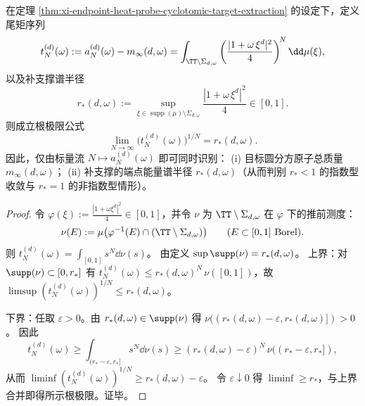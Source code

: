 \begin{theorem}[由单标量探针序列识别补支撑谱半径]\label{thm:xi-endpoint-heat-probe-complement-radius-from-scalar-flow}
在定理 \ref{thm:xi-endpoint-heat-probe-cyclotomic-target-extraction} 的设定下，定义尾矩序列
\[
t_N^{(d)}(\omega):=a_N^{(d)}(\omega)-m_\infty(d,\omega)
=\int_{\TT\setminus\Sigma_{d,\omega}}\left(\frac{|1+\omega\,\xi^{d}|^{2}}{4}\right)^{\!N}\dd\mu(\xi),
\]
以及补支撑谱半径
\[
r_{\ast}(d,\omega)
:=\sup_{\xi\in\operatorname{supp}(\mu)\setminus\Sigma_{d,\omega}}\frac{|1+\omega\,\xi^{d}|^{2}}{4}\in[0,1].
\]
则成立根极限公式
\[
\boxed{\;
\lim_{N\to\infty}\bigl(t_N^{(d)}(\omega)\bigr)^{1/N}=r_{\ast}(d,\omega).\;}
\]
因此，仅由标量流 \(N\mapsto a_N^{(d)}(\omega)\) 即可同时识别：
(i) 目标圆分方原子总质量 \(m_\infty(d,\omega)\)；
(ii) 补支撑的端点能量谱半径 \(r_\ast(d,\omega)\)（从而判别 \(r_\ast<1\) 的指数型收敛与 \(r_\ast=1\) 的非指数型情形）。
\end{theorem}
\begin{proof}
令 \(\varphi(\xi):=\frac{|1+\omega\xi^{d}|^{2}}{4}\in[0,1]\)，并令 \(\nu\) 为 \(\TT\setminus\Sigma_{d,\omega}\) 在 \(\varphi\) 下的推前测度：
\[
\nu(E):=\mu\bigl(\varphi^{-1}(E)\cap(\TT\setminus\Sigma_{d,\omega})\bigr)\qquad(E\subset[0,1]\ \text{Borel}).
\]
则
\(
t_N^{(d)}(\omega)=\int_{[0,1]} s^{N}\dd\nu(s)
\)。
由定义 \(\sup\supp(\nu)=r_{\ast}(d,\omega)\)。
上界：对 \(\supp(\nu)\subset[0,r_\ast]\) 有
\(
t_N^{(d)}(\omega)\le r_\ast(d,\omega)^N\,\nu([0,1])
\)，故 \(\limsup (t_N^{(d)}(\omega))^{1/N}\le r_\ast(d,\omega)\)。
\par
下界：任取 \(\varepsilon>0\)。由 \(r_\ast(d,\omega)\in\supp(\nu)\) 得 \(\nu((r_\ast(d,\omega)-\varepsilon,r_\ast(d,\omega)])>0\)。
因此
\[
t_N^{(d)}(\omega)\ge \int_{(r_\ast-\varepsilon,r_\ast]} s^N\dd\nu(s)
\ge (r_\ast(d,\omega)-\varepsilon)^N\,\nu((r_\ast-\varepsilon,r_\ast]),
\]
从而 \(\liminf (t_N^{(d)}(\omega))^{1/N}\ge r_\ast(d,\omega)-\varepsilon\)。
令 \(\varepsilon\downarrow 0\) 得 \(\liminf\ge r_\ast\)，与上界合并即得所示根极限。证毕。
\end{proof}

\endinput
